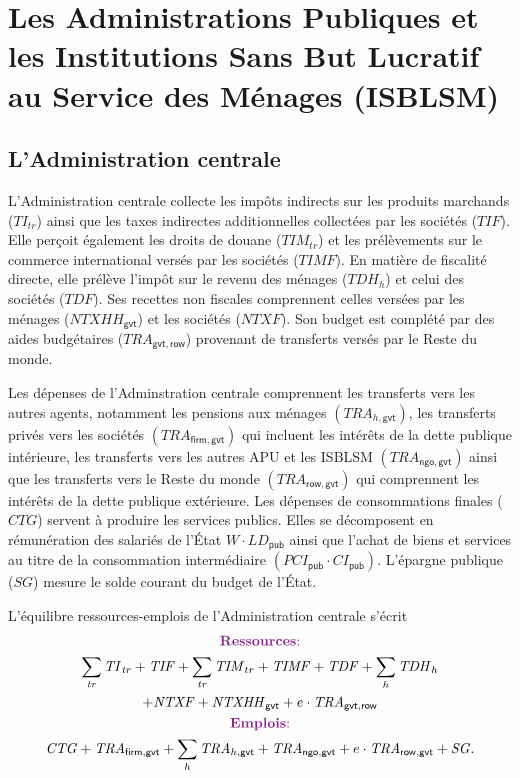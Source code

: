 \documentclass[11pt,a4paper]{article}
\newcommand{\firm}{\mathsf{firm}}
\newcommand{\gvt}{\mathsf{gvt}}
\newcommand{\ngo}{\mathsf{ngo}}
\newcommand{\pub}{\mathsf{pub}}
\newcommand{\row}{\mathsf{row}}
\newcommand{\tr}{\mathit{tr}}
\newcommand{\CI}{\mathit{CI}}
\newcommand{\CTG}{\mathit{CTG}}
\newcommand{\LD}{\mathit{LD}}
\newcommand{\NTXF}{\mathit{NTXF}}
\newcommand{\NTXHH}{\mathit{NTXHH}}
\newcommand{\PCI}{\mathit{PCI}}
\newcommand{\SG}{\mathit{SG}}
\newcommand{\TDF}{\mathit{TDF}}
\newcommand{\TDH}{\mathit{TDH}}
\newcommand{\TI}{\mathit{TI}}
\newcommand{\TIF}{\mathit{TIF}}
\newcommand{\TIM}{\mathit{TIM}}
\newcommand{\TIMF}{\mathit{TIMF}}
\newcommand{\TRA}{\mathit{TRA}}
\begin{document}
	\section{Les Administrations Publiques et les Institutions Sans But Lucratif au Service des Ménages (ISBLSM)}
	\subsection{L'Administration centrale}
	
	L'Administration centrale collecte les impôts indirects sur les produits marchands ($\TI_{tr}$) ainsi que les taxes indirectes additionnelles collectées par les sociétés ($\TIF$). Elle perçoit également les droits de douane ($\TIM_{tr}$) et les prélèvements sur le commerce international versés par les sociétés ($\TIMF$). En matière de fiscalité directe, elle prélève l'impôt sur le revenu des ménages ($\TDH_h$) et celui des sociétés ($\TDF$). Ses recettes non fiscales comprennent celles versées par les ménages ($\NTXHH_{\gvt}$) et les sociétés ($\NTXF$). Son budget est complété par des aides budgétaires ($\TRA_{\gvt,\row}$) provenant de transferts versés par le Reste du monde.
	
	Les dépenses de l'Adminstration centrale comprennent les transferts vers les autres agents, notamment les pensions aux ménages $\left(\TRA_{h,\gvt}\right)$, les transferts privés vers les sociétés $\left(\TRA_{\firm,\gvt}\right)$ qui incluent les intérêts de la dette publique intérieure, les transferts vers les autres APU et les ISBLSM $\left(\TRA_{\ngo,\gvt}\right)$ ainsi que les transferts vers le Reste du monde $\left(\TRA_{\row,\gvt}\right)$ qui comprennent les intérêts de la dette publique extérieure. Les dépenses de consommations finales ($\CTG$) servent à produire les services publics. Elles se décomposent en rémunération des salariés de l'État $W\cdot\LD_{\pub}$ ainsi que l'achat de biens et services au titre de la consommation intermédiaire $\left(\PCI_{\pub}\cdot\CI_{\pub}\right)$. L'épargne publique ($\SG$) mesure le solde courant du budget de l'État.
	
	L'équilibre ressources-emplois de l'Administration centrale s'écrit		
	\begin{gather}
		\centerline{\textcolor{Fuchsia}{\textbf{Ressources}:}} \notag\\
		\sum_{\tr}\TI_{\tr} + \TIF + \sum_{\tr}\TIM_{tr} + \TIMF + \TDF +  \sum_{h} \TDH_h\notag\\
		+ \NTXF + \NTXHH_{\gvt} + e\cdot \TRA_{\gvt,\row}\notag\\
		\centerline{\textcolor{Fuchsia}{\textbf{Emplois}:}} \notag\\
		\CTG + \TRA_{\firm,\gvt}  + \sum_{h}\TRA_{h,\gvt} + \TRA_{\ngo,\gvt} + e\cdot\TRA_{\row,\gvt} + \SG.\notag
	\end{gather}
	
\end{document}
